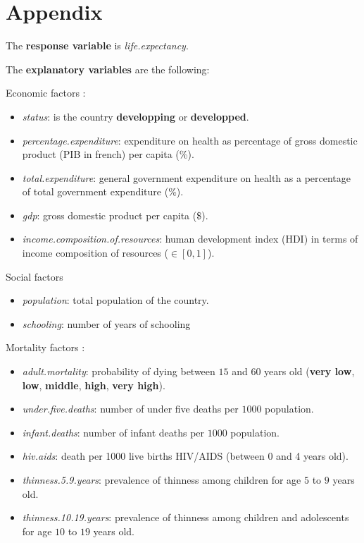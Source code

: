 \section*{Appendix}

The \textbf{response variable} is \textit{life.expectancy}.

The \textbf{explanatory variables} are the following:

Economic factors :
\begin{itemize}
	\item \textit{status}: is the country \textbf{developping} or \textbf{developped}.
	\item \textit{percentage.expenditure}: expenditure on health as percentage of gross domestic product (PIB in french) per capita (\%).
	\item \textit{total.expenditure}: general government expenditure on health as a percentage of total government expenditure (\%).
	\item \textit{gdp}: gross domestic product per capita (\$).
	\item \textit{income.composition.of.resources}: human development index (HDI) in terms of income composition of resources ($\in [0,1]$).
\end{itemize}

Social factors
\begin{itemize}
	\item \textit{population}: total population of the country.
	\item \textit{schooling}: number of years of schooling
\end{itemize}

Mortality factors : 
\begin{itemize}
	\item \textit{adult.mortality}: probability of dying between $15$ and $60$ years old (\textbf{very low}, \textbf{low}, \textbf{middle}, \textbf{high}, \textbf{very high}).
	\item \textit{under.five.deaths}: number of under five deaths per $1000$ population.
	\item \textit{infant.deaths}: number of infant deaths per $1000$ population.
	\item \textit{hiv.aids}: death per 1000 live births HIV/AIDS (between 0 and 4 years old).
	\item \textit{thinness.5.9.years}: prevalence of thinness among children for age $5$ to $9$ years old.
	\item \textit{thinness.10.19.years}: prevalence of thinness among children and adolescents for age $10$ to $19$ years old.
\end{itemize}


